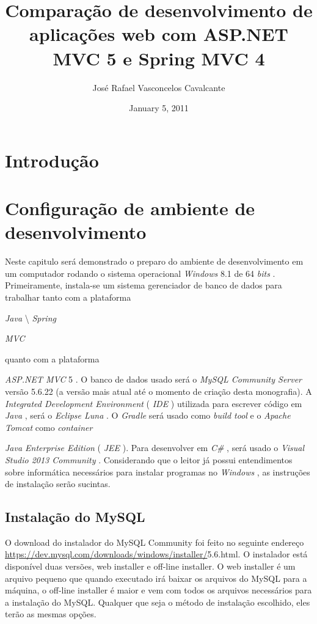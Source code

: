 \documentclass[a4paper,12pt]{article}
\newcommand{\anmvc} {
	\sigla{ASP.NET MVC} 5
}
\newcommand{\spring} {
	\lang{Java}\textbackslash \est{Spring} \sigla{MVC}
}
\newcommand{\est}[1] {
	\textit{#1}
}
\newcommand{\sigla}[1] {
	\textit{#1}
}
\newcommand{\lang}[1] {
	\textit{#1}
}
\begin{document}
\title{Comparação de desenvolvimento de aplicações web com ASP.NET MVC 5 e Spring MVC 4}
\author{José Rafael Vasconcelos Cavalcante}
\date{January 5, 2011}
\maketitle

\section{Introdução}

\section{Configuração de ambiente de desenvolvimento}

Neste capitulo será demonstrado o preparo do ambiente de desenvolvimento em um computador rodando o sistema operacional \est{Windows} 8.1 de 64 \est{bits}. Primeiramente, instala-se um sistema gerenciador de banco de dados para trabalhar tanto com a plataforma \spring quanto com a plataforma \anmvc.  O banco de dados usado será o \est{MySQL Community Server} versão 5.6.22 (a versão mais atual até o momento de criação desta monografia). A \est{Integrated Development Environment} (\sigla{IDE}) utilizada  para escrever código em \lang{Java}, será o \est{Eclipse Luna}. O \est{Gradle} será usado como \est{build tool} e o \est{Apache Tomcat} como \est{container} \est{Java Enterprise Edition} (\sigla{JEE}). Para desenvolver em \lang{C\#}, será usado o \est{Visual Studio 2013 Community}. Considerando que o leitor já possui entendimentos sobre informática necessários para instalar programas no \est{Windows}, as instruções de instalação serão sucintas. 

\subsection{Instalação do MySQL}

O download do instalador do MySQL Community foi feito no seguinte endereço \url{https://dev.mysql.com/downloads/windows/installer/}5.6.html. O instalador está disponível duas versões, web installer e off-line installer. O web installer é um arquivo pequeno que quando executado irá baixar os arquivos do MySQL para a máquina, o off-line installer  é maior e vem com todos os arquivos necessários para a  instalação do MySQL. Qualquer que seja o método de instalação escolhido, eles terão as mesmas opções.
\end{document}
